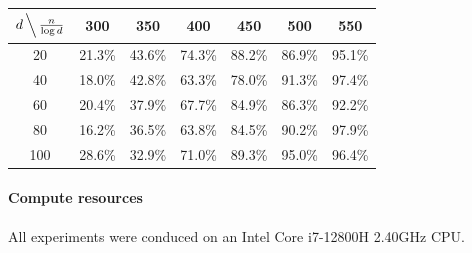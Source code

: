 \documentclass{article}
\theoremstyle{definition}
\theoremstyle{definition}
\theoremstyle{definition}
\theoremstyle{definition}
\theoremstyle{definition}
\theoremstyle{definition}
\theoremstyle{remark}
\theoremstyle{remark}
\begin{document}
\begin{itemize}
    \begin{table}[h]
    \centering
    \begin{tabular}{c|cccccc}
    \hline
    $d \, \Big\backslash \, \frac{n}{\log d}$ & 300 & 350 & 400 & 450 & 500 & 550 \\
    \hline
    20  & 21.3\% & 43.6\% & 74.3\% & 88.2\% & 86.9\% & 95.1\% \\
    40  & 18.0\% & 42.8\% & 63.3\% & 78.0\% & 91.3\% & 97.4\% \\
    60  & 20.4\% & 37.9\% & 67.7\% & 84.9\% & 86.3\% & 92.2\% \\
    80  & 16.2\% & 36.5\% & 63.8\% & 84.5\% & 90.2\% & 97.9\% \\
    100 & 28.6\% & 32.9\% & 71.0\% & 89.3\% & 95.0\% & 96.4\% \\
    \hline
    \end{tabular}
    \end{table}

\end{itemize}

\paragraph{Compute resources}
All experiments were conduced on an Intel Core i7-12800H 2.40GHz CPU.

 
   
\end{document}
